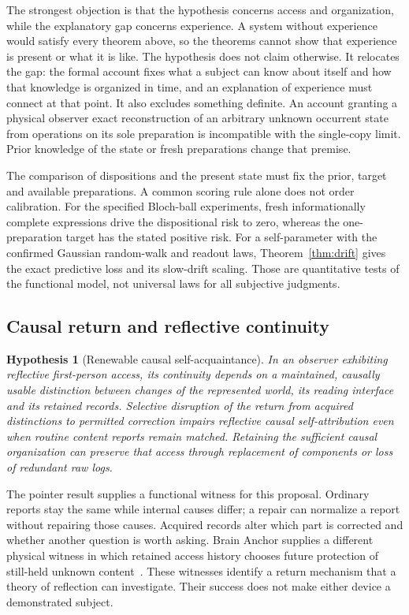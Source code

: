 \documentclass[12pt]{article}
\newtheorem{hypothesis}[theorem]{Hypothesis}
\theoremstyle{definition}
\theoremstyle{remark}
\begin{document}
The strongest objection is that the hypothesis concerns access and organization, while the explanatory gap concerns experience. A system without experience would satisfy every theorem above, so the theorems cannot show that experience is present or what it is like. The hypothesis does not claim otherwise. It relocates the gap: the formal account fixes what a subject can know about itself and how that knowledge is organized in time, and an explanation of experience must connect at that point. It also excludes something definite. An account granting a physical observer exact reconstruction of an arbitrary unknown occurrent state from operations on its sole preparation is incompatible with the single-copy limit. Prior knowledge of the state or fresh preparations change that premise.

The comparison of dispositions and the present state must fix the prior,
target and available preparations. A common scoring rule alone does not
order calibration. For the specified Bloch-ball experiments, fresh
informationally complete expressions drive the dispositional risk to zero,
whereas the one-preparation target has the stated positive risk.
For a self-parameter with the confirmed Gaussian random-walk and readout
laws, Theorem~\ref{thm:drift} gives the exact predictive loss and its
slow-drift scaling. Those are quantitative tests of the functional model,
not universal laws for all subjective judgments.

\subsection{Causal return and reflective continuity}

\begin{hypothesis}[Renewable causal self-acquaintance]
\label{hyp:causal_return}
In an observer exhibiting reflective first-person access, its continuity
depends on a maintained, causally usable distinction between changes of
the represented world, its reading interface and its retained records.
Selective disruption of the return from acquired distinctions to
permitted correction impairs reflective causal self-attribution even
when routine content reports remain matched. Retaining the sufficient
causal organization can preserve that access through replacement of
components or loss of redundant raw logs.
\end{hypothesis}

The pointer result supplies a functional witness for this proposal.
Ordinary reports stay the same while internal causes differ; a repair
can normalize a report without repairing those causes. Acquired
records alter which part is corrected and whether another question is
worth asking. Brain Anchor supplies a different physical witness in
which retained access history chooses future protection of still-held
unknown content~\cite{BrainAnchor}. These witnesses identify a return
mechanism that a theory of reflection can investigate. Their success
does not make either device a demonstrated subject.
\end{document}
